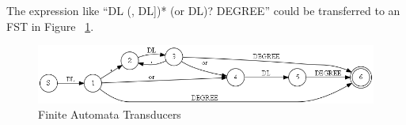 The expression like ``DL (, DL])*  (or DL)? DEGREE'' could be transferred to an FST in Figure ~\ref{fig:fst}.

\begin{figure}[htbp]
  \centering
  \includegraphics[scale=0.6]{images/test_tokenre2_6.png}
  \caption{Finite Automata Transducers}
  \label{fig:fst}
\end{figure}


